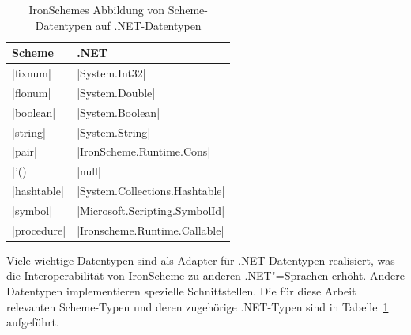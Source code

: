 \begin{table}[h!]
	\centering
	\begin{tabular}{@{}ll@{}}
		\toprule
			Scheme & .NET \\
		\midrule
			{\scm|fixnum|}		& {\csh|System.Int32|}			\\
			{\scm|flonum|}		& {\csh|System.Double|}			\\
			{\scm|boolean|}		& {\csh|System.Boolean|}		\\
			{\scm|string|}		& {\csh|System.String|}			\\
			{\scm|pair|}		& {\csh|IronScheme.Runtime.Cons|}	\\
			{\scm|'()|}		& {\csh|null|}				\\
			{\scm|hashtable|}	& {\csh|System.Collections.Hashtable|}	\\
			{\scm|symbol|}		& {\csh|Microsoft.Scripting.SymbolId|}	\\
			{\scm|procedure|}	& {\csh|Ironscheme.Runtime.Callable|}	\\
		\bottomrule		
	\end{tabular}
	\caption{IronSchemes Abbildung von Scheme-Datentypen auf .NET-Datentypen}
	\label{tab:typemapping}
\end{table}

Viele wichtige Datentypen sind als Adapter für .NET-Datentypen realisiert, was die Interoperabilität von IronScheme zu anderen .NET"=Sprachen erhöht. Andere Datentypen implementieren spezielle Schnittstellen. Die für diese Arbeit relevanten Scheme-Typen und deren zugehörige .NET-Typen sind in Tabelle~\ref{tab:typemapping} aufgeführt.

